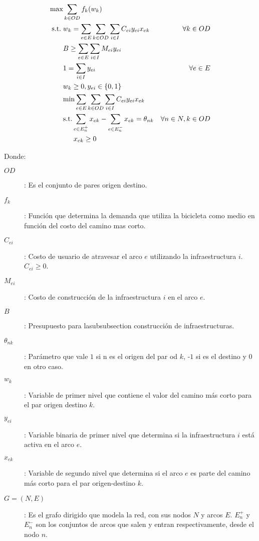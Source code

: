 \documentclass{article}
\newcommand{\modelspace}{\hspace{1.5em}}
\begin{document}
  \begin{align}
    \text{max}    & \sum_{k \in OD} f_k(w_k)                                                         & \label{eq:objective1lvl} \\
    \text{s.t.}\; & w_k = \sum_{e \in E} \sum_{k \in OD} \sum_{i \in I} C_{ei}y_{ei}x_{ek}           & \forall k \in OD \label{eq:shortestpath} \\
                  & B \geq \sum_{e \in E} \sum_{i \in I} M_{ei}y_{ei}                                & \label{eq:respectbudget} \\
                  & 1 = \sum_{i \in I} y_{ei}                                                        & \forall e \in E \label{eq:alwaysoney} \\
                  & w_k \geq 0, y_{ei} \in \left\{ 0, 1 \right\}                                     & \nonumber \\
                  & \text{min} \sum_{e \in E} \sum_{k \in OD} \sum_{i \in I} C_{ei}y_{ei}x_{ek}      & \label{eq:subproblem} \\
                  & \text{s.t.} \sum_{e \in E_n^+} x_{ek} - \sum_{e \in E_n^-} x_{ek} = \theta_{nk}  & \forall n \in N, k \in OD \label {eq:flowbalance} \\
                  & \modelspace x_{ek} \geq 0                                                        & \nonumber
  \end{align}

  Donde:

  \begin{description}
    \item[$OD$]: Es el conjunto de pares origen destino.
    \item[$f_k$]: Función que determina la demanda que utiliza la bicicleta como medio en función del costo del camino mas corto.
    \item[$C_{ei}$]: Costo de usuario de atravesar el arco $e$ utilizando la infraestructura $i$. $C_{ei} \geq 0$.
    \item[$M_{ei}$]: Costo de construcción de la infraestructura $i$ en el arco $e$.
    \item[$B$]: Presupuesto para lasubsubsection construcción de infraestructuras.
    \item[$\theta_{nk}$]: Parámetro que vale $1$ si n es el origen del par od $k$, -$1$ si es el destino y $0$ en otro caso.
    \item[$w_k$]: Variable de primer nivel que contiene el valor del camino más corto para el par origen destino $k$.
    \item[$y_{ei}$]: Variable binaria de primer nivel que determina si la infraestructura $i$ está activa en el arco $e$.
    \item[$x_{ek}$]: Variable de segundo nivel que determina si el arco $e$ es parte del camino más corto para el par origen-destino $k$.
    \item[$G=(N,E)$]: Es el grafo dirigido que modela la red, con sus nodos $N$ y arcos $E$. $E_n^+$ y $E_n^-$ son los conjuntos de arcos que salen y entran respectivamente, desde el nodo $n$.
  \end{description}
\end{document}
